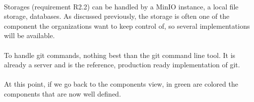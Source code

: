 \paragraph{}
Storages (requirement R2.2) can be handled by a MinIO instance, a local file storage, databases. As discussed previously, the storage is often one of the component the organizations want to keep control of, so several implementations will be available.

\paragraph{}
To handle git commands, nothing best than the git command line tool. It is already a server and is the reference, production ready implementation of git. 

\paragraph{}
At this point, if we go back to the components view, in green are colored the components that are now well defined. 


